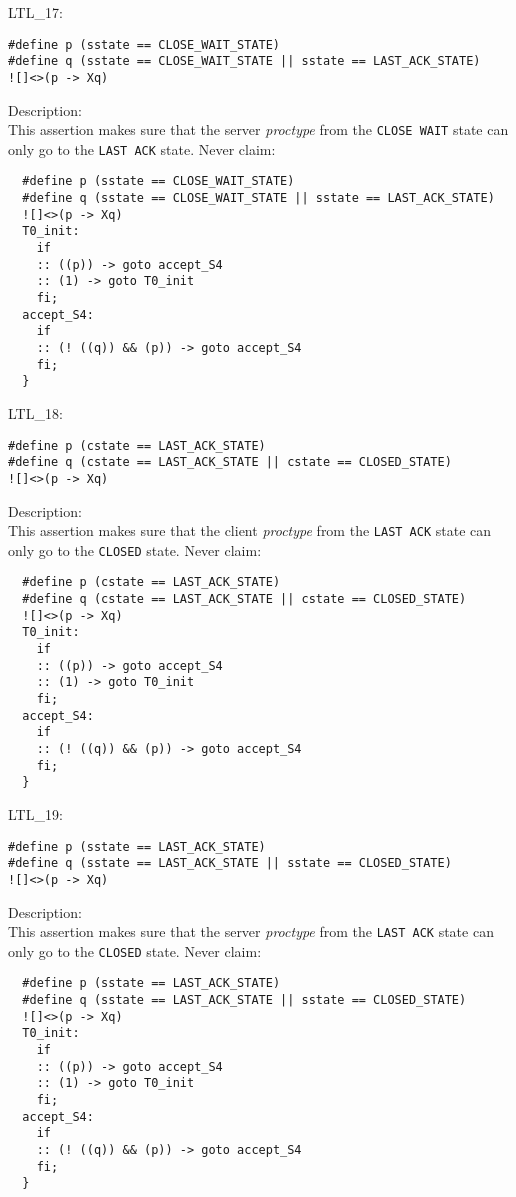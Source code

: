 \documentclass{WigReport}
\begin{document}
LTL\_17:\\
\begin{lstlisting}
#define p (sstate == CLOSE_WAIT_STATE)
#define q (sstate == CLOSE_WAIT_STATE || sstate == LAST_ACK_STATE)
![]<>(p -> Xq)
\end{lstlisting}
Description:\\
This assertion makes sure that the server \textit{proctype} from the \verb|CLOSE WAIT| state can only go to the \verb|LAST ACK| state.
Never claim:\\
\begin{lstlisting}
  #define p (sstate == CLOSE_WAIT_STATE)
  #define q (sstate == CLOSE_WAIT_STATE || sstate == LAST_ACK_STATE)
  ![]<>(p -> Xq)
  T0_init:
    if
    :: ((p)) -> goto accept_S4
    :: (1) -> goto T0_init
    fi;
  accept_S4:
    if
    :: (! ((q)) && (p)) -> goto accept_S4
    fi;
  }
\end{lstlisting}


LTL\_18:\\
\begin{lstlisting}
#define p (cstate == LAST_ACK_STATE)
#define q (cstate == LAST_ACK_STATE || cstate == CLOSED_STATE)
![]<>(p -> Xq)
\end{lstlisting}
Description:\\
This assertion makes sure that the client \textit{proctype} from the \verb|LAST ACK| state can only go to the \verb|CLOSED| state.
Never claim:\\
\begin{lstlisting}
  #define p (cstate == LAST_ACK_STATE)
  #define q (cstate == LAST_ACK_STATE || cstate == CLOSED_STATE)
  ![]<>(p -> Xq)
  T0_init:
    if
    :: ((p)) -> goto accept_S4
    :: (1) -> goto T0_init
    fi;
  accept_S4:
    if
    :: (! ((q)) && (p)) -> goto accept_S4
    fi;
  }
\end{lstlisting}


LTL\_19:\\
\begin{lstlisting}
#define p (sstate == LAST_ACK_STATE)
#define q (sstate == LAST_ACK_STATE || sstate == CLOSED_STATE)
![]<>(p -> Xq)
\end{lstlisting}
Description:\\
This assertion makes sure that the server \textit{proctype} from the \verb|LAST ACK| state can only go to the \verb|CLOSED| state.
Never claim:\\
\begin{lstlisting}
  #define p (sstate == LAST_ACK_STATE)
  #define q (sstate == LAST_ACK_STATE || sstate == CLOSED_STATE)
  ![]<>(p -> Xq)
  T0_init:
    if
    :: ((p)) -> goto accept_S4
    :: (1) -> goto T0_init
    fi;
  accept_S4:
    if
    :: (! ((q)) && (p)) -> goto accept_S4
    fi;
  }
\end{lstlisting}
\end{document}
